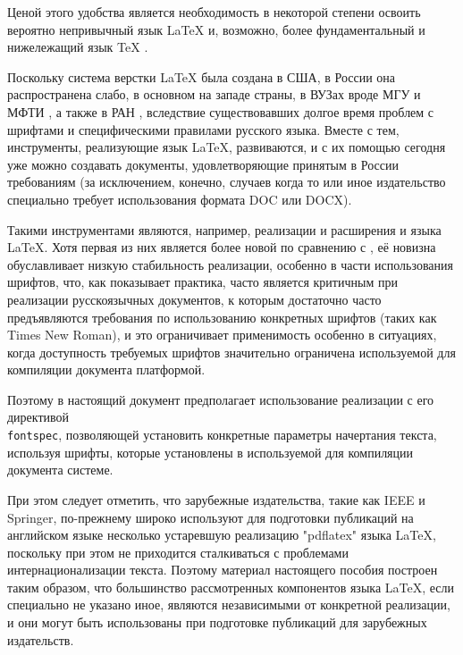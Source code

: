 \documentclass[workbook, draught]{fefudoc}
\begin{document}
Ценой этого удобства является необходимость в некоторой степени освоить вероятно непривычный язык \LaTeX{} и, возможно, более фундаментальный  и нижележащий язык \TeX{} \cite{TheTexBook}.

Поскольку система верстки \LaTeX{} была создана в США, в России она распространена слабо, в основном на западе страны, в ВУЗах вроде МГУ и МФТИ \cite{ctan-disser-mipt}, а также в РАН \cite{RAS-latex}, вследствие существовавших долгое время проблем с шрифтами и специфическими правилами русского языка.
Вместе с тем, инструменты, реализующие язык \LaTeX{}, развиваются, и с их помощью сегодня уже можно создавать документы, удовлетворяющие принятым в России требованиям (за исключением, конечно, случаев когда то или иное издательство специально требует использования формата DOC или DOCX).

Такими инструментами являются, например, реализации и расширения \LuaLaTeX{} и \XeLaTeX{} языка \LaTeX{}.
Хотя первая из них является более новой по сравнению с \XeLaTeX{}, её новизна обуславливает низкую стабильность реализации, особенно в части использования шрифтов, что, как показывает практика, часто является критичным при реализации русскоязычных документов, к которым достаточно часто предъявляются требования по использованию конкретных шрифтов (таких как Times New Roman), и это ограничивает применимость \LuaLaTeX{} особенно в ситуациях, когда доступность требуемых шрифтов значительно ограничена используемой для компиляции документа платформой.

Поэтому в настоящий документ предполагает использование реализации \XeLaTeX{} с его директивой \texttt{\\fontspec}, позволяющей установить конкретные параметры начертания текста, используя шрифты, которые установлены в используемой для компиляции документа системе.

При этом следует отметить, что зарубежные издательства, такие как IEEE и Springer, по-прежнему широко используют для подготовки публикаций на английском языке несколько устаревшую реализацию "pdflatex" языка \LaTeX{}, поскольку при этом не приходится сталкиваться с проблемами интернационализации текста.
Поэтому материал настоящего пособия построен таким образом, что большинство рассмотренных компонентов языка \LaTeX{}, если специально не указано иное, являются независимыми от конкретной реализации, и они могут быть использованы при подготовке публикаций для зарубежных издательств.
\end{document}
